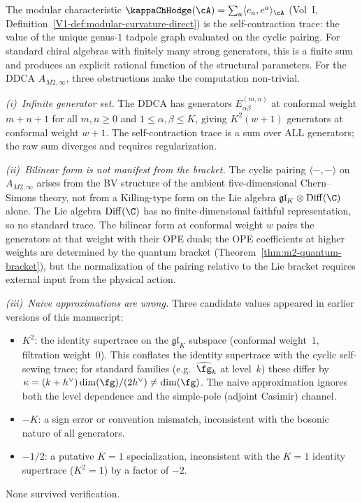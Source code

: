 \begin{remark}
\label{rem:kappa-m2-regularization}
The modular characteristic
$\kappaChHodge(\cA) = \sum_a \langle e_a, e^a\rangle_\cA$
(Vol~I, Definition~\ref*{V1-def:modular-curvature-direct})
is the self-contraction trace: the value of the
unique genus-$1$ tadpole graph evaluated on the
cyclic pairing. For standard chiral algebras with
finitely many strong generators, this is a finite
sum and produces an explicit rational function of the
structural parameters. For the DDCA $A_{M2,\infty}$,
three obstructions make the computation non-trivial.

\emph{(i)~Infinite generator set.}
The DDCA has generators $E^{(m,n)}_{\alpha\beta}$
at conformal weight $m + n + 1$ for all $m, n \ge 0$
and $1 \le \alpha, \beta \le K$, giving
$K^2(w+1)$ generators at conformal weight $w+1$.
The self-contraction trace is a sum over ALL generators;
the raw sum diverges and requires regularization.

\emph{(ii)~Bilinear form is not manifest from the bracket.}
The cyclic pairing $\langle -, -\rangle$ on
$A_{M2,\infty}$ arises from the BV structure of the
ambient five-dimensional Chern--Simons theory, not from
a Killing-type form on the Lie algebra
$\mathfrak{gl}_K\otimes\Diff(\C)$ alone. The Lie algebra
$\Diff(\C)$ has no finite-dimensional faithful
representation, so no standard trace. The bilinear
form at conformal weight $w$ pairs the generators at
that weight with their OPE duals; the OPE coefficients
at higher weights are determined by the quantum bracket
(Theorem~\ref{thm:m2-quantum-bracket}), but the
normalization of the pairing relative to the Lie bracket
requires external input from the physical action.

\emph{(iii)~Naive approximations are wrong.}
Three candidate values appeared in earlier versions
of this manuscript:
\begin{itemize}
\item $K^2$: the identity supertrace on the
 $\mathfrak{gl}_K$ subspace
 (conformal weight~$1$, filtration weight~$0$).
 This conflates the identity supertrace with the
 cyclic self-sewing trace; for standard families
 (e.g.\ $\widehat{\fg}_k$ at level~$k$) these differ
 by $\kappa = (k+h^\vee)\dim(\fg)/(2h^\vee)
 \neq \dim(\fg)$.
 The naive approximation ignores both the level
 dependence and the simple-pole (adjoint Casimir)
 channel.
\item $-K$: a sign error or convention mismatch,
 inconsistent with the bosonic nature of all generators.
\item $-1/2$: a putative $K=1$ specialization,
 inconsistent with the $K=1$ identity supertrace
 ($K^2 = 1$) by a factor of $-2$.
\end{itemize}
None survived verification.


\end{remark}

